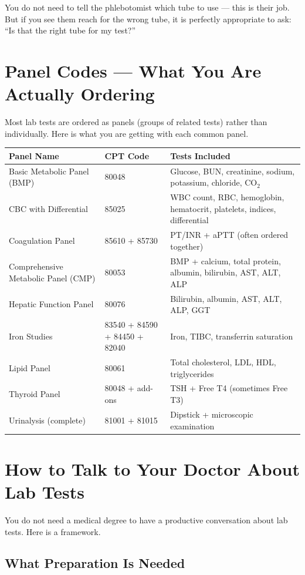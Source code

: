 You do not need to tell the phlebotomist which tube to use --- this is their job. But if you see them reach for the wrong tube, it is perfectly appropriate to ask: ``Is that the right tube for my test?''

\clearpage
\section{Panel Codes --- What You Are Actually Ordering}

Most lab tests are ordered as panels (groups of related tests) rather than individually. Here is what you are getting with each common panel.

\begin{longtable}{@{}lll@{}}
\toprule
\textbf{Panel Name} & \textbf{CPT Code} & \textbf{Tests Included} \\
\midrule
Basic Metabolic Panel (BMP) & 80048 & Glucose, BUN, creatinine, sodium, potassium, chloride, CO$_2$ \\
CBC with Differential & 85025 & WBC count, RBC, hemoglobin, hematocrit, platelets, indices, differential \\
Coagulation Panel & 85610 + 85730 & PT/INR + aPTT (often ordered together) \\
Comprehensive Metabolic Panel (CMP) & 80053 & BMP + calcium, total protein, albumin, bilirubin, AST, ALT, ALP \\
Hepatic Function Panel & 80076 & Bilirubin, albumin, AST, ALT, ALP, GGT \\
Iron Studies & 83540 + 84590 + 84450 + 82040 & Iron, TIBC, transferrin saturation \\
Lipid Panel & 80061 & Total cholesterol, LDL, HDL, triglycerides \\
Thyroid Panel & 80048 + add-ons & TSH + Free T4 (sometimes Free T3) \\
Urinalysis (complete) & 81001 + 81015 & Dipstick + microscopic examination \\
\bottomrule
\end{longtable}

\clearpage
\section{How to Talk to Your Doctor About Lab Tests}

You do not need a medical degree to have a productive conversation about lab tests. Here is a framework.

\subsection{What Preparation Is Needed}

